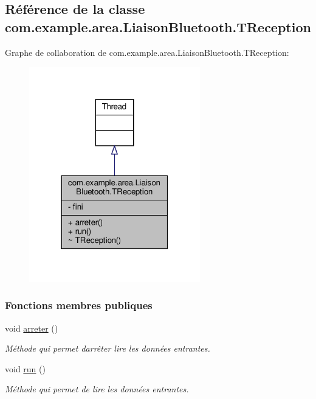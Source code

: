 \hypertarget{classcom_1_1example_1_1area_1_1_liaison_bluetooth_1_1_t_reception}{}\subsection{Référence de la classe com.\+example.\+area.\+Liaison\+Bluetooth.\+T\+Reception}
\label{classcom_1_1example_1_1area_1_1_liaison_bluetooth_1_1_t_reception}


Graphe de collaboration de com.\+example.\+area.\+Liaison\+Bluetooth.\+T\+Reception\+:
\nopagebreak
\begin{figure}[H]
\begin{center}
\leavevmode
\includegraphics[width=211pt]{classcom_1_1example_1_1area_1_1_liaison_bluetooth_1_1_t_reception__coll__graph}
\end{center}
\end{figure}
\subsubsection*{Fonctions membres publiques}
\begin{DoxyCompactItemize}
\item 
void \hyperlink{classcom_1_1example_1_1area_1_1_liaison_bluetooth_1_1_t_reception_a89f97f22a976b8632e82b2aa94ab2674}{arreter} ()
\begin{DoxyCompactList}\small\item\em Méthode qui permet d\textquotesingle{}arrêter lire les données entrantes. \end{DoxyCompactList}\item 
void \hyperlink{classcom_1_1example_1_1area_1_1_liaison_bluetooth_1_1_t_reception_afb141736dac915d0c82f96f75033f318}{run} ()
\begin{DoxyCompactList}\small\item\em Méthode qui permet de lire les données entrantes. \end{DoxyCompactList}\end{DoxyCompactItemize}
